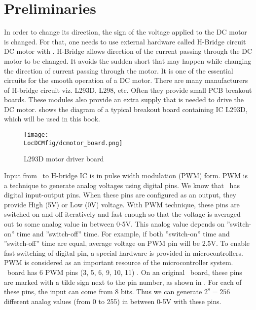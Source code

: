 \section{Preliminaries}
In order to change its direction, the sign of the voltage applied to
the DC motor is changed.  For that, one needs to use external hardware
called %
H-Bridge circuit DC motor with \arduino. %
H-Bridge allows direction of the current passing through the DC motor
to be changed. It avoids the sudden short that may happen while
changing the direction of current passing through the motor.  It is
one of the essential circuits for the smooth operation of a DC
motor. There are many manufacturers of H-bridge circuit viz.
%
L293D, L298, etc.  Often they provide small %
PCB breakout boards.  These modules also provide an extra supply that
is needed to drive the DC motor.   shows
the diagram of a typical breakout board containing IC L293D, which will
be used in this book. \par

\begin{figure}
  \centering
  \texttt{[image: \\LocDCMfig/dcmotor\_board.png]}
  \caption{L293D motor driver board}
  \label{fig:motordriverboard}
\end{figure}

Input from \arduino\ to H-bridge IC is in %
pulse width modulation (PWM) form. PWM is a technique to generate
analog voltages using digital pins. We know that \arduino\ has digital
input-output pins. When these pins are configured as an output, they
provide High (5V) or Low (0V) voltage. With PWM technique, these pins
are switched on and off iteratively and fast enough so that the
voltage is averaged out to some analog value in between 0-5V. This
analog value depends on ''switch-on'' time and ''switch-off''
time. For example, if both ''switch-on'' time and ''switch-off'' time
are equal, average voltage on PWM pin will be 2.5V. To enable fast
switching of digital pin, a special hardware is provided in
microcontrollers.  PWM is considered as an important resource of
the microcontroller system. \arduino\ board has 6 PWM pins (3, 5, 6, 9, 10, 11) \cite{arduino-pwm}. 
On an original \arduino\ board, these pins are marked with a tilde sign next to the pin number, 
as shown in . For each of these pins, the input can come from 8 bits.
Thus we can generate $2^8 = 256$ different analog values (from 0 to 255) 
in between 0-5V with these pins.

